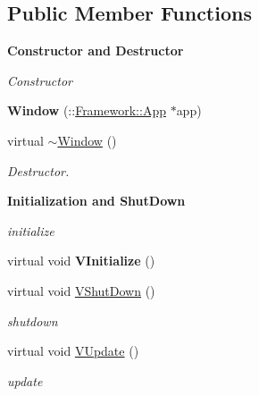 \subsection*{Public Member Functions}
\begin{Indent}{\bf Constructor and Destructor}\par
{\em \label{_amgrp65b93122a8e010d8931d904429460f59}
 Constructor }\begin{DoxyCompactItemize}
\item 
\hypertarget{classPlatform_1_1Window_afe578394a6cb586b30d06be4cdaa6083}{
{\bfseries Window} (::\hyperlink{classFramework_1_1App}{Framework::App} $\ast$app)}
\label{classPlatform_1_1Window_afe578394a6cb586b30d06be4cdaa6083}

\item 
\hypertarget{classPlatform_1_1Window_ae17c9c5eec8a3fc8ca26ae6816156358}{
virtual \hyperlink{classPlatform_1_1Window_ae17c9c5eec8a3fc8ca26ae6816156358}{$\sim$Window} ()}
\label{classPlatform_1_1Window_ae17c9c5eec8a3fc8ca26ae6816156358}

\begin{DoxyCompactList}\small\item\em Destructor. \item\end{DoxyCompactList}\end{DoxyCompactItemize}
\end{Indent}
\begin{Indent}{\bf Initialization and ShutDown}\par
{\em \label{_amgrp2a8ba145c14f2dcb11ba0fe271240078}
 initialize }\begin{DoxyCompactItemize}
\item 
\hypertarget{classPlatform_1_1Window_a84ba6faae3c59e9247fab3db598f571a}{
virtual void {\bfseries VInitialize} ()}
\label{classPlatform_1_1Window_a84ba6faae3c59e9247fab3db598f571a}

\item 
\hypertarget{classPlatform_1_1Window_a256881d8ee694cc19bafe70d87707d38}{
virtual void \hyperlink{classPlatform_1_1Window_a256881d8ee694cc19bafe70d87707d38}{VShutDown} ()}
\label{classPlatform_1_1Window_a256881d8ee694cc19bafe70d87707d38}

\begin{DoxyCompactList}\small\item\em shutdown \item\end{DoxyCompactList}\item 
\hypertarget{classPlatform_1_1Window_a37ac4d25e98bf007ffe375c6f8441115}{
virtual void \hyperlink{classPlatform_1_1Window_a37ac4d25e98bf007ffe375c6f8441115}{VUpdate} ()}
\label{classPlatform_1_1Window_a37ac4d25e98bf007ffe375c6f8441115}

\begin{DoxyCompactList}\small\item\em update \item\end{DoxyCompactList}\end{DoxyCompactItemize}
\end{Indent}
